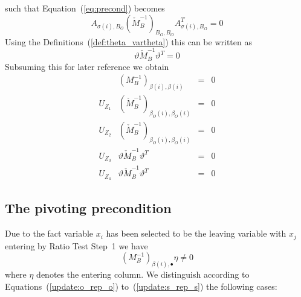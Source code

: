 \documentclass[a4paper]{article}
\begin{document}
such that Equation~(\ref{eq:precond}) becomes 
\begin{equation*}
A_{\sigma(i), B_{O}}\left(\check{M}_{B}^{-1}\right)_{B_{O}, B_{O}}
A_{\sigma(i), B_{O}}^{T} =0
\end{equation*}
Using the Definitions~(\ref{def:theta_vartheta}) this can be written as
\begin{equation}
\label{eq:precond_simplified}
\vartheta\check{M}_{B}^{-1}\vartheta^{T}=0
\end{equation}
Subsuming this for later reference we obtain 
\begin{equation}
\label{table:leaving_precond}
\begin{array}{c|ccc}
 & 
\left(M_{B}^{-1}\right)_{\beta(i), \beta(i)}
&=& 0
 \\
\hline
U_{Z_{1}}
&
\left(\check{M}_{B}^{-1}\right)_{\beta_{O}(i), \beta_{O}(i)}
&=& 0
 \\
U_{Z_{2}}
&
\left(\check{M}_{B}^{-1}\right)_{\beta_{O}(i), \beta_{O}(i)}
&=& 0
 \\
U_{Z_{3}}
&
\vartheta\check{M}_{B}^{-1}
\vartheta^{T}
&=& 0
 \\
U_{Z_{4}}
&
\vartheta\check{M}_{B}^{-1}\vartheta^{T}
&=& 0
\end{array}
\end{equation}

\subsection{The pivoting precondition}
Due to the fact variable $x_{i}$ has been selected to be the leaving variable with $x_{j}$ entering by Ratio Test Step~1 we have
\begin{equation}
\label{precond:pivot}
\left(M_{B}^{-1}\right)_{\beta(i), \bullet}\eta \neq 0
\end{equation}
where $\eta$ denotes the entering column. 
We distinguish according to Equations~(\ref{update:o_rep_o})
to~(\ref{update:s_rep_s}) the following cases:
\end{document}
